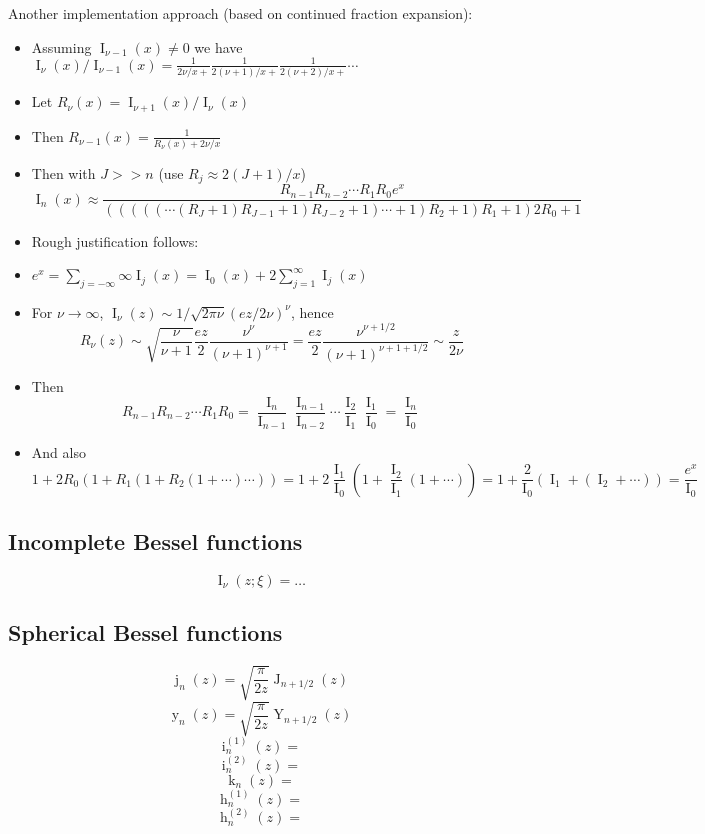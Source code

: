\documentclass[10pt,dvipdfmx,letterpaper,twoside]{article}
\let\O=\operatorname
\begin{document}
Another implementation approach (based on continued fraction expansion):
\begin{itemize}
  \item Assuming $\O{I}_{\nu-1}(x)\neq0$ we have $\O{I}_\nu(x)/\O{I}_{\nu-1}(x) = \frac{1}{2\nu/x+} \frac{1}{2(\nu+1)/x+} \frac{1}{2(\nu+2)/x+}\cdots$
  \item Let $R_\nu(x) = \O{I}_{\nu+1}(x)/\O{I}_{\nu}(x)$
  \item Then $R_{\nu-1}(x) = \frac{1}{R_\nu(x)+2\nu/x}$
  \item Then with $J>>n$ (use $R_j\approx 2(J+1)/x$)
    \[ \O{I}_n(x) \approx \frac{R_{n-1}R_{n-2}\cdots R_1 R_0 e^x}{(((((\cdots(R_J+1)R_{J-1}+1)R_{J-2}+1)\cdots+1)R_2+1)R_1+1)2R_0+1} \]
  \item Rough justification follows:
  \item $e^x = \sum_{j=-\infty}{\infty} \O{I}_j(x) = \O{I}_0(x) + 2\sum_{j=1}^\infty \O{I}_j(x)$
  \item For $\nu\to\infty$, $\O{I}_\nu(z) \sim 1/\sqrt{2\pi\nu} (ez/2\nu)^\nu$, hence
    \[ R_\nu(z) \sim \sqrt{\frac{\nu}{\nu+1}}\frac{ez}{2} \frac{\nu^\nu}{(\nu+1)^{\nu+1}} = \frac{ez}{2}\frac{\nu^{\nu+1/2}}{(\nu+1)^{\nu+1+1/2}} \sim \frac{z}{2\nu} \]
  \item Then
    \[ R_{n-1}R_{n-2}\cdots R_1 R_0 = \frac{\O{I}_n}{\O{I}_{n-1}}\frac{\O{I}_{n-1}}{\O{I}_{n-2}}\cdots\frac{\O{I}_2}{\O{I}_1}\frac{\O{I}_1}{\O{I}_0}
        = \frac{\O{I}_n}{\O{I}_0} \]
  \item And also
    \[ 1+2R_0(1+R_1(1+R_2(1+\cdots)\cdots)) = 1+2\frac{\O{I}_1}{\O{I}_0}(1+\frac{\O{I}_2}{\O{I}_1}(1+\cdots)) = 1+\frac{2}{\O{I}_0}(\O{I}_1+(\O{I}_2+\cdots))
        = \frac{e^x}{\O{I}_0} \]
\end{itemize}

\subsection{Incomplete Bessel functions}

\[ \O{I}_\nu(z; \xi) = \dots \]

\subsection{Spherical Bessel functions}

\[ \O{j}_n(z) = \sqrt{\frac{\pi}{2z}} \O{J}_{n+1/2}(z) \]
\[ \O{y}_n(z) = \sqrt{\frac{\pi}{2z}} \O{Y}_{n+1/2}(z) \]
\[ \O{i}^{(1)}_n(z) = \]
\[ \O{i}^{(2)}_n(z) = \]
\[ \O{k}_n(z) = \]
\[ \O{h}^{(1)}_n(z) = \]
\[ \O{h}^{(2)}_n(z) = \]
\end{document}
